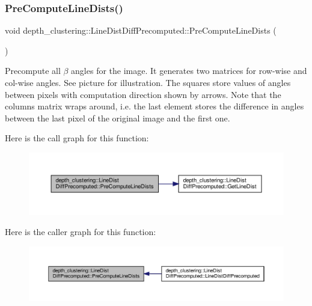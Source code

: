 \subsubsection{\texorpdfstring{Pre\+Compute\+Line\+Dists()}{PreComputeLineDists()}}
{\footnotesize\ttfamily void depth\+\_\+clustering\+::\+Line\+Dist\+Diff\+Precomputed\+::\+Pre\+Compute\+Line\+Dists (\begin{DoxyParamCaption}{ }\end{DoxyParamCaption})\hspace{0.3cm}{\ttfamily [protected]}}



Precompute all $\beta$ angles for the image. It generates two matrices for row-\/wise and col-\/wise angles. See picture for illustration. The squares store values of angles between pixels with computation direction shown by arrows. Note that the columns matrix wraps around, i.\+e. the last element stores the difference in angles between the last pixel of the original image and the first one. 

 Here is the call graph for this function\+:\nopagebreak
\begin{figure}[H]
\begin{center}
\leavevmode
\includegraphics[width=350pt]{classdepth__clustering_1_1LineDistDiffPrecomputed_a9d0211af30be1f60ef4e8db570128a7b_cgraph}
\end{center}
\end{figure}
Here is the caller graph for this function\+:\nopagebreak
\begin{figure}[H]
\begin{center}
\leavevmode
\includegraphics[width=350pt]{classdepth__clustering_1_1LineDistDiffPrecomputed_a9d0211af30be1f60ef4e8db570128a7b_icgraph}
\end{center}
\end{figure}
\mbox{\label{classdepth__clustering_1_1LineDistDiffPrecomputed_a77c9cf3bea954f13cd2fef4f8a182425}} 
